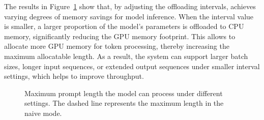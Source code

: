 The results in Figure~\ref{fig:eval4} show that, by adjusting the offloading intervals, \sys achieves varying degrees of memory savings for model inference. 
When the interval value is smaller, a larger proportion of the model's parameters is offloaded to CPU memory, significantly reducing the GPU memory footprint. 
This allows \sys to allocate more GPU memory for token processing, thereby increasing the maximum allocatable length. 
As a result, the system can support larger batch sizes, longer input sequences, or extended output sequences under smaller interval settings, which helps to improve throughput.


\begin{figure}[t]
    \centering
    \resizebox{0.5\columnwidth}{!}{
 }
    \caption{Maximum prompt length the model can process under different \interval settings.
 The dashed line represents the maximum length in the naive mode.}
    \label{fig:eval4}
\end{figure}

